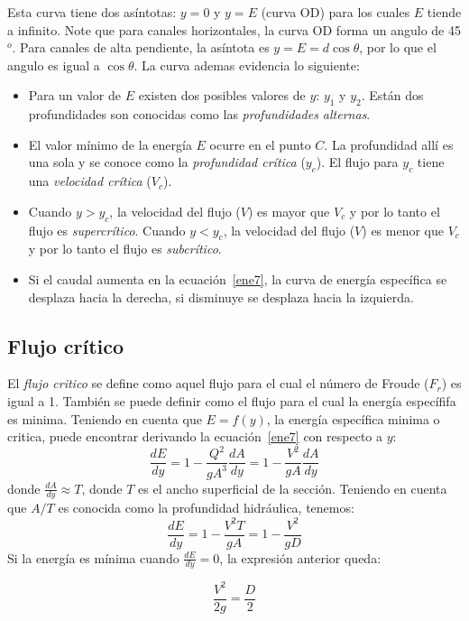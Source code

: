\documentclass[11pt, oneside]{article}
\begin{document}
Esta curva tiene dos asíntotas: $y=0$ y $y=E$ (curva OD) para los cuales $E$ tiende a infinito. Note que para canales horizontales, la curva OD forma un angulo de 45$^o$. Para canales de alta pendiente, la asíntota es $y=E=d \cos \theta$, por lo que el angulo es igual a $\cos \theta$. La curva ademas evidencia lo siguiente:
\begin{itemize}
\item Para un valor de $E$ existen dos posibles valores de $y$: $y_1$ y $y_2$. Est\'an dos profundidades son conocidas como las \emph{profundidades alternas}.
\item El valor m\'inimo de la energ\'ia $E$ ocurre en el punto $C$. La profundidad all\'i es una sola y se conoce como la \emph{profundidad cr\'itica} ($y_c$). El flujo para $y_c$ tiene una \emph{velocidad cr\'itica} ($V_c$). 
\item Cuando $y > y_c$, la velocidad del flujo ($V$) es mayor que $V_c$ y por lo tanto el flujo es \emph{supercr\'itico}. Cuando $y < y_c$, la velocidad del flujo ($V$) es menor que $V_c$ y por lo tanto el flujo es \emph{subcr\'itico}.
\item Si el caudal aumenta en la ecuaci\'on~\ref{ene7}, la curva de energ\'ia espec\'ifica se desplaza hacia la derecha, si disminuye se desplaza hacia la izquierda. 
\end{itemize}

\subsection{Flujo cr\'itico}
El \emph{flujo critico} se define como aquel flujo para el cual el n\'umero de Froude ($F_r$) es igual a 1. Tambi\'en se puede definir como el flujo para el cual la energ\'ia espec\'ififa es minima. Teniendo en cuenta que $E=f(y)$, la energ\'ia espec\'ifica minima o critica, puede encontrar derivando la ecuaci\'on~\ref{ene7} con respecto a $y$:
$$
\frac{dE}{dy} = 1 - \frac{Q^2}{gA^3} \frac{dA}{dy} = 1 - \frac{V^2}{gA} \frac{dA}{dy}
$$
donde $\frac{dA}{dy} \approx T$, donde $T$ es el ancho superficial de la secci\'on. Teniendo en cuenta que $A/T$ es conocida como la profundidad hidr\'aulica, tenemos:
$$
\frac{dE}{dy} = 1 -  \frac{V^2 T}{gA} = 1 -  \frac{V^2}{gD} 
$$
Si la energ\'ia es m\'inima cuando  $\frac{dE}{dy}=0$, la expresi\'on anterior queda:

\begin{equation}
\frac{V^2}{2g} = \frac{D}{2} 
\label{ene8}
\end{equation}
\end{document}
